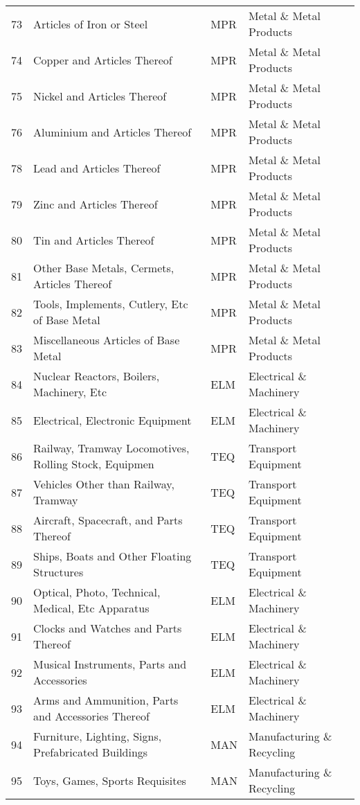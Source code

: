 \documentclass[a4paper]{article}
\begin{document}
\begin{table}[ht]
{\begin{tabular}{rlll}
  73 & Articles of Iron or Steel & MPR & Metal \& Metal Products \\ 
  74 & Copper and Articles Thereof & MPR & Metal \& Metal Products \\ 
  75 & Nickel and Articles Thereof & MPR & Metal \& Metal Products \\ 
  76 & Aluminium and Articles Thereof & MPR & Metal \& Metal Products \\ 
  78 & Lead and Articles Thereof & MPR & Metal \& Metal Products \\ 
  79 & Zinc and Articles Thereof & MPR & Metal \& Metal Products \\ 
  80 & Tin and Articles Thereof & MPR & Metal \& Metal Products \\ 
  81 & Other Base Metals, Cermets, Articles Thereof & MPR & Metal \& Metal Products \\ 
  82 & Tools, Implements, Cutlery, Etc of Base Metal & MPR & Metal \& Metal Products \\ 
  83 & Miscellaneous Articles of Base Metal & MPR & Metal \& Metal Products \\ 
  84 & Nuclear Reactors, Boilers, Machinery, Etc & ELM & Electrical \& Machinery \\ 
  85 & Electrical, Electronic Equipment & ELM & Electrical \& Machinery \\ 
  86 & Railway, Tramway Locomotives, Rolling Stock, Equipmen & TEQ & Transport Equipment \\ 
  87 & Vehicles Other than Railway, Tramway & TEQ & Transport Equipment \\ 
  88 & Aircraft, Spacecraft, and Parts Thereof & TEQ & Transport Equipment \\ 
  89 & Ships, Boats and Other Floating Structures & TEQ & Transport Equipment \\ 
  90 & Optical, Photo, Technical, Medical, Etc Apparatus & ELM & Electrical \& Machinery \\ 
  91 & Clocks and Watches and Parts Thereof & ELM & Electrical \& Machinery \\ 
  92 & Musical Instruments, Parts and Accessories & ELM & Electrical \& Machinery \\ 
  93 & Arms and Ammunition, Parts and Accessories Thereof & ELM & Electrical \& Machinery \\ 
  94 & Furniture, Lighting, Signs, Prefabricated Buildings & MAN & Manufacturing \& Recycling \\ 
  95 & Toys, Games, Sports Requisites & MAN & Manufacturing \& Recycling \\ 

\end{tabular}}
\end{table}
\end{document}
